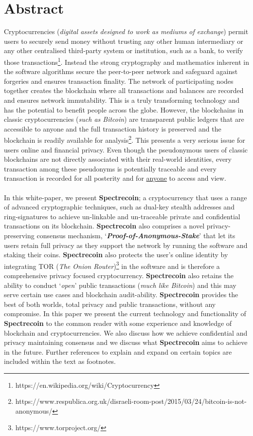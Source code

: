 \section{Abstract}
Cryptocurrencies (\textit{digital assets designed to work as mediums of exchange})
permit users to securely send money without trusting any other human intermediary
or any other centralised third-party system or institution, such as a bank, to
verify those transactions\footnote{https://en.wikipedia.org/wiki/Cryptocurrency}.
Instead the strong cryptography and mathematics inherent in the software
algorithms secure the peer-to-peer network and safeguard against forgeries and
ensures transaction finality. The network of participating nodes together
creates the blockchain where all transactions and balances are recorded and
ensures network immutability. This is a truly transforming technology and has
the potential to benefit people across the globe. However, the blockchains in
classic cryptocurrencies (\textit{such as Bitcoin}) are transparent public
ledgers that are accessible to anyone and the full transaction history is
preserved and the blockchain is readily available for analysis\footnote{https://www.respublica.org.uk/disraeli-room-post/2015/03/24/bitcoin-is-not-anonymous/}. 
This presents a very serious issue for users online and financial privacy.
Even though the pseudonymous users of classic blockchains are not directly
associated with their real-world identities, every transaction among these
pseudonyms is potentially traceable and every transaction is recorded for
all posterity and for \underline{anyone} to access and view.
\\
\\
In this white-paper, we present \textbf{Spectrecoin}; a cryptocurrency that
uses a range of advanced cryptographic techniques, such as dual-key stealth
addresses and ring-signatures to achieve un-linkable and un-traceable
private and confidential transactions on its blockchain. \textbf{Spectrecoin}
also comprises a novel privacy-preserving consensus mechanism,
‘\textbf{\textit{Proof-of-Anonymous-Stake}}’ that let its users retain
full privacy as they support the network by running the software and
staking their coins. \textbf{Spectrecoin} also protects the user’s online
identity by integrating TOR (\textit{The Onion Router})\footnote{https://www.torproject.org/} 
in the software and is therefore a
comprehensive privacy focused cryptocurrency. \textbf{Spectrecoin} also
retains the ability to conduct ‘\textit{open}’ public transactions
(\textit{much like Bitcoin}) and this may serve certain use cases and
blockchain audit-ability. \textbf{Spectrecoin} provides the best of both
worlds, total privacy and public transactions, without any compromise.
In this paper we present the current technology and functionality of
\textbf{Spectrecoin} to the common reader with some experience and knowledge
of blockchain and cryptocurrencies. We also discuss how we achieve
confidential and privacy maintaining consensus and we discuss what
\textbf{Spectrecoin} aims to achieve in the future. Further references
to explain and expand on certain topics are included within the text as
footnotes.
